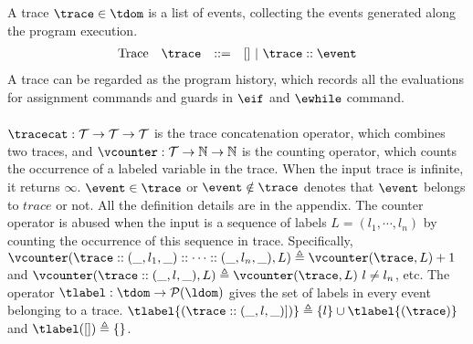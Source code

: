 %
A trace $\trace \in \tdom $ is a list of events, 
collecting the events generated along the program execution. 
\[
\begin{array}{llll}
\mbox{Trace} & \trace
& ::= & [] ~|~ \trace :: \event
\end{array}
\]
A trace can be regarded as the program history, 
which records all the evaluations for assignment commands and guards in $\eif$ and $\ewhile$ command.
\\
\\
$\tracecat: \mathcal{T} \to \mathcal{T} \to \mathcal{T}$ is the trace concatenation operator, which combines two traces,
and $\vcounter : \mathcal{T} \to \mathbb{N} \to \mathbb{N}$ is the counting operator, 
which counts the occurrence of a labeled variable in the trace. When the input trace is infinite, it returns $\infty$.
$\event \in \trace $ or $\event \notin \trace $ denotes that $\event$ belongs to $trace$ or not.
All the definition details are in the appendix.
%
The counter operator is abused when the input is a sequence of labels $L = (l_1, \cdots, l_n)$ by counting the occurrence
of this sequence in trace. Specifically,
$\vcounter(\trace :: (\_, l_1, \_) :: \cdots :: (\_, l_n, \_), L ) \triangleq \vcounter(\trace, L) + 1$
and $\vcounter(\trace :: (\_, l, \_), L ) 
\triangleq \vcounter(\trace, L) ~ l \neq l_n$, etc.
The operator $\tlabel : \tdom \to \mathcal{P}{(\ldom)}$ gives the set of labels in every event belonging to a trace.
$\tlabel{(\trace  :: (\_, l, \_)])} \triangleq \{l\} \cup \tlabel{(\trace )}$ and $\tlabel({[ ]}) \triangleq \{\}$.